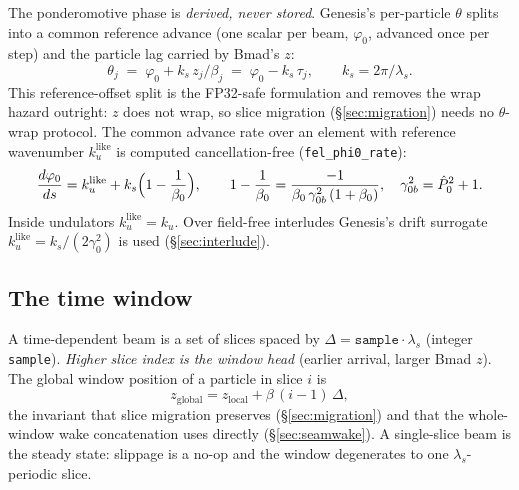 \documentclass[11pt]{article}
\newcommand{\code}[1]{\texttt{#1}}
\begin{document}
The ponderomotive phase is \emph{derived, never stored}. Genesis's per-particle
$\theta$ splits into a common reference advance (one scalar per beam, $\varphi_0$,
advanced once per step) and the particle lag carried by Bmad's $z$:
\begin{equation}\label{eq:theta}
  \theta_j \;=\; \varphi_0 + k_s\, z_j/\beta_j \;=\; \varphi_0 - k_s\,\tau_j ,
  \qquad k_s = 2\pi/\lambda_s .
\end{equation}
This reference-offset split is the FP32-safe formulation and removes
the wrap hazard outright: $z$ does not wrap, so slice migration
(\S\ref{sec:migration}) needs no $\theta$-wrap protocol. The common advance rate over
an element with reference wavenumber $k_u^{\mathrm{like}}$ is computed
cancellation-free (\code{fel\_phi0\_rate}):
\begin{equation}\label{eq:phi0rate}
  \frac{d\varphi_0}{ds} = k_u^{\mathrm{like}} + k_s\Bigl(1 - \frac{1}{\beta_0}\Bigr),
  \qquad
  1 - \frac{1}{\beta_0} = \frac{-1}{\beta_0\,\gamma_{0b}^2\,(1+\beta_0)},\quad
  \gamma_{0b}^2 = \hat P_0^2 + 1 .
\end{equation}
Inside undulators $k_u^{\mathrm{like}} = k_u$. Over field-free interludes Genesis's
drift surrogate $k_u^{\mathrm{like}} = k_s/(2\gamma_0^2)$ is used
(\S\ref{sec:interlude}).

\subsection{The time window}\label{sec:window}

A time-dependent beam is a set of slices spaced by
$\Delta = \code{sample}\cdot\lambda_s$ (integer \code{sample}). \emph{Higher slice
index is the window head} (earlier arrival, larger Bmad $z$). The global window
position of a particle in slice $i$ is
\begin{equation}\label{eq:zglobal}
  z_{\mathrm{global}} = z_{\mathrm{local}} + \beta\,(i-1)\,\Delta ,
\end{equation}
the invariant that slice migration preserves (\S\ref{sec:migration}) and that the
whole-window wake concatenation uses directly (\S\ref{sec:seamwake}). A single-slice
beam is the steady state: slippage is a no-op and the window degenerates to one
$\lambda_s$-periodic slice.
\end{document}
